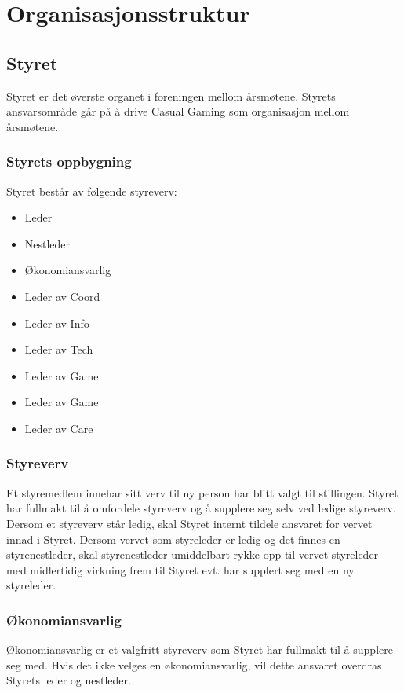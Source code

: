\chapter{Organisasjonsstruktur}

\section{Styret}
Styret er det øverste organet i foreningen mellom årsmøtene. Styrets ansvarsområde går på å drive Casual Gaming som organisasjon mellom årsmøtene.

\subsection{Styrets oppbygning}
Styret består av følgende styreverv:
\begin{itemize}
    \item Leder
    \item Nestleder
    \item Økonomiansvarlig
    \item Leder av Coord
    \item Leder av Info
    \item Leder av Tech
    \item Leder av Game
    \item Leder av Game
    \item Leder av Care
\end{itemize}

\subsection{Styreverv}
Et styremedlem innehar sitt verv til ny person har blitt valgt til stillingen. Styret har fullmakt til å omfordele styreverv og å supplere seg selv ved ledige styreverv. Dersom et styreverv står ledig, skal Styret internt tildele ansvaret for vervet innad i Styret. Dersom vervet som styreleder er ledig og det finnes en styrenestleder, skal styrenestleder umiddelbart rykke opp til vervet styreleder med midlertidig virkning frem til Styret evt. har supplert seg med en ny styreleder.

\subsection{Økonomiansvarlig}
Økonomiansvarlig er et valgfritt styreverv som Styret har fullmakt til å supplere seg med. Hvis det ikke velges en økonomiansvarlig, vil dette ansvaret overdras Styrets leder og nestleder.


